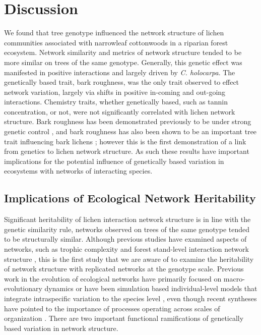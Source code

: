 \documentclass[fleqn,12pt]{olplainarticle}
\begin{document}
\section*{Discussion}


We found that tree genotype influenced the network structure of lichen
communities associated with narrowleaf cottonwoods in a riparian
forest ecosystem. Network similarity and metrics of network structure
tended to be more similar on trees of the same genotype. Generally,
this genetic effect was manifested in positive interactions and
largely driven by \textit{C. holocarpa}. The genetically based trait,
bark roughness, was the only trait observed to effect network
variation, largely via shifts in positive in-coming and out-going
interactions. Chemistry traits, whether genetically based, such as
tannin concentration, or not, were not significantly correlated with
lichen network structure. Bark roughness has been demonstrated
previously to be under strong genetic control \citep{Bdeir2017}, and
bark roughness has also been shown to be an important tree trait
influencing bark lichens \citep{Lamit2015a}; however this is the first
demonstration of a link from genetics to lichen network structure.  As
such these results have important implications for the potential
influence of genetically based variation in ecosystems with networks
of interacting species.


\subsection*{Implications of Ecological Network Heritability}

Significant heritability of lichen interaction network structure is in
line with the genetic similarity rule, networks observed on trees of
the same genotype tended to be structurally similar. Although previous
studies have examined aspects of networks, such as trophic complexity
\citep{Barbour2016GeneticComplexity} and forest stand-level
interaction network structure \citep{Lau2016GenotypicEvolution,
  Keith2017}, this is the first study that we are aware of to examine
the heritability of network structure with replicated networks at the
genotype scale. Previous work in the evolution of ecological networks
have primarily focused on macro-evolutionary dynamics
\citep{Rezende2007, Weber2017EvolutionMacroevolution,
  Valverde2018TheSpandrel, Harmon2019DetectingInteractions} or have
been simulation based individual-level models that integrate
intraspecific variation to the species level
\citep{Maliet2020AnNetworks}, even though recent syntheses have pointed
to the importance of processes operating across scales of organization
\citep{Guimaraes2020TheOrganization}. There are two important
functional ramifications of genetically based variation in network
structure.
\end{document}
